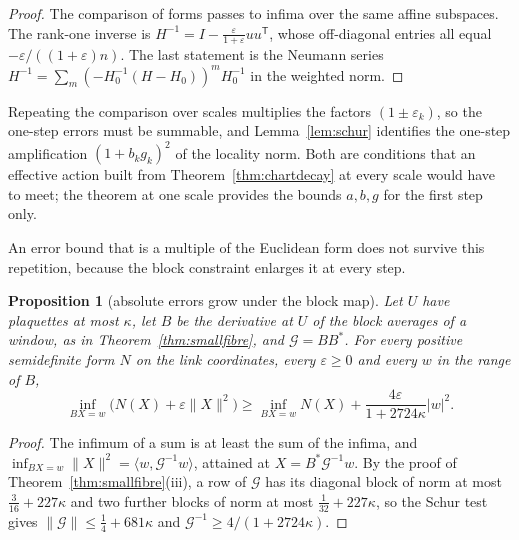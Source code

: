 \documentclass[11pt]{amsart}
\newtheorem{proposition}[theorem]{Proposition}
\theoremstyle{definition}
\theoremstyle{remark}
\numberwithin{equation}{section}
\begin{document}
\begin{proof}
The comparison of forms passes to infima over the same affine subspaces.
The rank-one inverse is $H^{-1}=I-\frac\varepsilon{1+\varepsilon}uu^{\mathsf
T}$, whose off-diagonal entries all equal $-\varepsilon/((1+\varepsilon)
n)$. The last statement is the Neumann series $H^{-1}=\sum_m(-H_0^{-1}(H-
H_0))^mH_0^{-1}$ in the weighted norm.
\end{proof}

Repeating the comparison over scales multiplies the factors $(1\pm
\varepsilon_k)$, so the one-step errors must be summable, and
Lemma~\ref{lem:schur} identifies the one-step amplification $(1+b_kg_k)^2$
of the locality norm. Both are conditions that an effective action built
from Theorem~\ref{thm:chartdecay} at every scale would have to meet; the
theorem at one scale provides the bounds $a,b,g$ for the first step only.

An error bound that is a multiple of the Euclidean form does not survive
this repetition, because the block constraint enlarges it at every step.

\begin{proposition}[absolute errors grow under the block map]\label{prop:massgrowth}
Let $U$ have plaquettes at most $\kappa$, let $B$ be the derivative at $U$
of the block averages of a window, as in Theorem~\ref{thm:smallfibre}, and
$\mathcal G=BB^*$. For every positive semidefinite form $N$ on the link
coordinates, every $\varepsilon\ge0$ and every $w$ in the range of $B$,
\[
\inf_{BX=w}\bigl(N(X)+\varepsilon\lVert X\rVert^2\bigr)\ge\inf_{BX=w}N(X)
+\frac{4\varepsilon}{1+2724\kappa}\lvert w\rvert^2 .
\]
\end{proposition}

\begin{proof}
The infimum of a sum is at least the sum of the infima, and
$\inf_{BX=w}\lVert X\rVert^2=\langle w,\mathcal G^{-1}w\rangle$, attained
at $X=B^*\mathcal G^{-1}w$. By the proof of
Theorem~\ref{thm:smallfibre}(iii), a row of $\mathcal G$ has its diagonal
block of norm at most $\frac3{16}+227\kappa$ and two further blocks of norm
at most $\frac1{32}+227\kappa$, so the Schur test gives $\lVert\mathcal G
\rVert\le\frac14+681\kappa$ and $\mathcal G^{-1}\ge4/(1+2724\kappa)$.
\end{proof}
\end{document}
